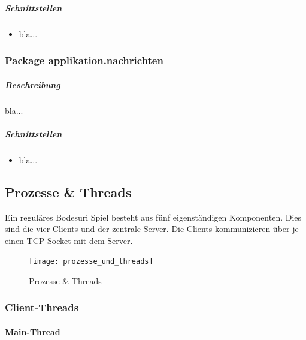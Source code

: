 \documentclass[12pt,halfparskip]{scrartcl}
\begin{document}
\subparagraph{Schnittstellen}
\label{ssub:schnittstellen}
\begin{itemize}
	\item bla...
\end{itemize}

\clearpage
\subsubsection{Package applikation.nachrichten}
\label{ssub:package_applikation_nachrichten} %
\subparagraph{Beschreibung}
\label{ssub:beschreibung}
bla...

\subparagraph{Schnittstellen}
\label{ssub:schnittstellen}
\begin{itemize}
	\item bla...
\end{itemize}


\clearpage

\subsection{Prozesse \& Threads} %
\label{sub:prozesse_threads}

Ein reguläres Bodesuri Spiel besteht aus fünf eigenständigen Komponenten. Dies sind die vier Clients und der zentrale Server. Die Clients kommunizieren über je einen TCP Socket mit dem Server.

\begin{figure}[h]
	\centering
	\texttt{[image: prozesse\_und\_threads]}
	\caption{Prozesse \& Threads}
	\label{fig:prozesse_und_threads}
\end{figure}

\subsubsection{Client-Threads} %
\label{ssub:client_threads}


\paragraph{Main-Thread} %
\label{ssub:main_thread}
\end{document}

